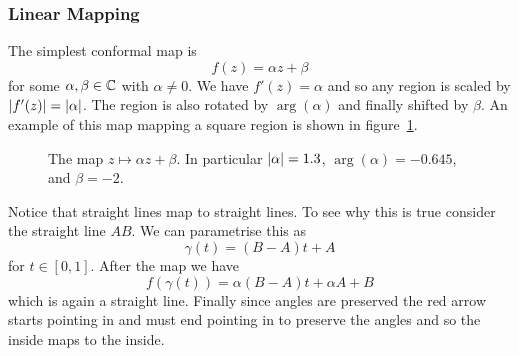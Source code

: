 \documentclass{article}
\begin{document}
    \subsubsection{Linear Mapping}
    The simplest conformal map is 
    \[f(z) = \alpha z + \beta\]
    for some \(\alpha, \beta\in\mathbb{C}\) with \(\alpha \ne 0\).
    We have \(f'(z) = \alpha\) and so any region is scaled by \(\abs{f'(z)} = \abs{\alpha}\).
    The region is also rotated by \(\arg(\alpha)\) and finally shifted by \(\beta\).
    An example of this map mapping a square region is shown in figure~\ref{fig:linear conformal map}.
    \begin{figure}[ht]
        \centering
        \tikzexternalenable
        \tikzexternaldisable
        \caption{The map \(z\mapsto \alpha z + \beta\). In particular \(\abs{\alpha} = 1.3\), \(\arg(\alpha) = -0.645\), and \(\beta = -2\).}
        \label{fig:linear conformal map}
    \end{figure}
    Notice that straight lines map to straight lines.
    To see why this is true consider the straight line \(AB\).
    We can parametrise this as
    \[\gamma(t) = (B - A)t + A\]
    for \(t\in[0, 1]\).
    After the map we have
    \[f(\gamma(t)) = \alpha(B - A)t + \alpha A + B\]
    which is again a straight line.
    Finally since angles are preserved the red arrow starts pointing in and must end pointing in to preserve the angles and so the inside maps to the inside.
    
\end{document}
